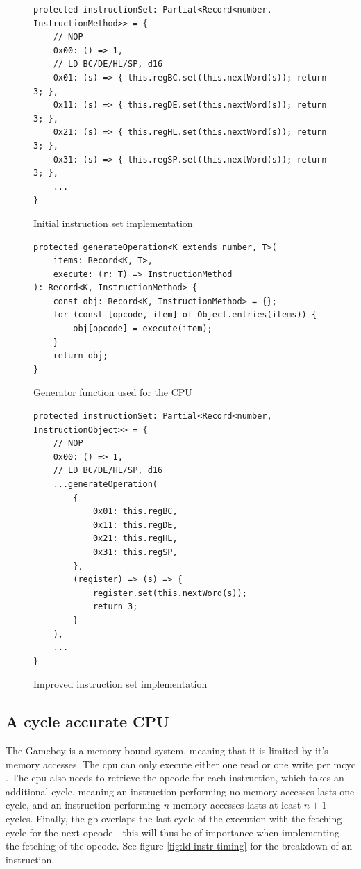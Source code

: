 \documentclass[11pt]{report}
\begin{document}
\begin{figure}[h]
    \begin{verbatim}
protected instructionSet: Partial<Record<number, InstructionMethod>> = {
    // NOP
    0x00: () => 1,
    // LD BC/DE/HL/SP, d16
    0x01: (s) => { this.regBC.set(this.nextWord(s)); return 3; },
    0x11: (s) => { this.regDE.set(this.nextWord(s)); return 3; },
    0x21: (s) => { this.regHL.set(this.nextWord(s)); return 3; },
    0x31: (s) => { this.regSP.set(this.nextWord(s)); return 3; },
    ...
}
    \end{verbatim}
    \caption{Initial instruction set implementation}
    \label{fig:instset-first}
\end{figure}

\begin{figure}[h]
    \begin{verbatim}
protected generateOperation<K extends number, T>(
    items: Record<K, T>,
    execute: (r: T) => InstructionMethod
): Record<K, InstructionMethod> {
    const obj: Record<K, InstructionMethod> = {};
    for (const [opcode, item] of Object.entries(items)) {
        obj[opcode] = execute(item);
    }
    return obj;
}
    \end{verbatim}
    \caption{Generator function used for the CPU}
    \label{fig:cpu-gen-function}
\end{figure}

\begin{figure}[h]
    \begin{verbatim}
protected instructionSet: Partial<Record<number, InstructionObject>> = {
    // NOP
    0x00: () => 1,
    // LD BC/DE/HL/SP, d16
    ...generateOperation(
        {
            0x01: this.regBC,
            0x11: this.regDE,
            0x21: this.regHL,
            0x31: this.regSP,
        },
        (register) => (s) => {
            register.set(this.nextWord(s));
            return 3;
        }
    ),
    ...
}
    \end{verbatim}
    \caption{Improved instruction set implementation}
    \label{fig:instset-second}
\end{figure}

\subsection{A cycle accurate CPU}

The Gameboy is a memory-bound system, meaning that it is limited by it's memory accesses. The \gls{cpu} can only execute either one read or one write per \gls{mcyc} \cite[CPU core timing]{gbctr}. The \gls{cpu} also needs to retrieve the opcode for each instruction, which takes an additional cycle, meaning an instruction performing no memory accesses lasts one cycle, and an instruction performing $n$ memory accesses lasts at least $n + 1$ cycles. Finally, the \gls{gb} overlaps the last cycle of the execution with the fetching cycle for the next opcode - this will thus be of importance when implementing the fetching of the opcode. See figure \ref{fig:ld-instr-timing} for the breakdown of an instruction.
\end{document}
